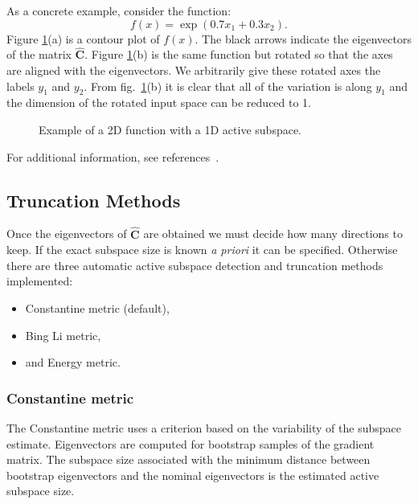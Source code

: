 As a concrete example, consider the function:~\cite{constantine2015active}
$$f(x) = \exp\left(0.7x_1 + 0.3x_2\right).$$
Figure \ref{fig:activesubspace}(a) is a contour plot of $f(x)$. The black arrows indicate the
eigenvectors of the matrix $\hat{\mathbf{C}}$. Figure \ref{fig:activesubspace}(b) is the same 
function but rotated so that the axes are aligned with the eigenvectors. We arbitrarily
give these rotated axes the labels $y_1$ and $y_2$. From fig.~\ref{fig:activesubspace}(b) it is
clear that all of the variation is along $y_1$ and the dimension of the rotated
input space can be reduced to 1.

\begin{figure}[htbp]
  \begin{subfigmatrix}{2}
  \end{subfigmatrix}
  \caption{Example of a 2D function with a 1D active subspace.}
\label{fig:activesubspace}
\end{figure}

For additional information, see references~\cite{Constantine-preprint-active,constantine2014active,constantine2015active}.

\subsection{Truncation Methods}\label{Sec:trunc}
Once the eigenvectors of $\hat{\mathbf{C}}$ are obtained we must decide how many
directions to keep. If the exact subspace size is known \textit{a priori} it can be
specified. Otherwise there are three automatic active subspace detection and
truncation methods implemented:
\begin{itemize}
\item Constantine metric (default),
\item Bing Li metric,
\item and Energy metric.
\end{itemize}

\subsubsection{Constantine metric}\label{SubSec:constantine}
The Constantine metric uses a criterion based on the variability of the subspace estimate. 
Eigenvectors are computed for bootstrap samples of the gradient matrix. The 
subspace size associated with the minimum distance between bootstrap 
eigenvectors and the nominal eigenvectors is the estimated active subspace
size.

